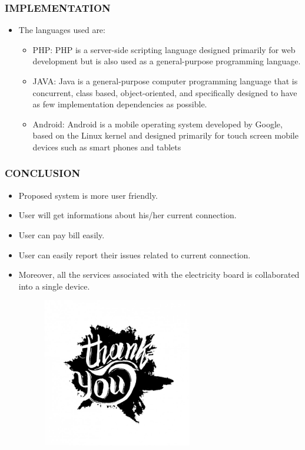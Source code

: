\documentclass{beamer} %
\theoremstyle{definition} %
\begin{document}
\begin{frame}
\frametitle{IMPLEMENTATION}
\begin{itemize}
\item The languages used are:
\begin{itemize}
	\item PHP: PHP is a server-side scripting language designed primarily for web development but is also used as a general-purpose programming language.
	\item JAVA: Java is a general-purpose computer programming language that is concurrent, class based, object-oriented, and speciﬁcally designed to have as few implementation dependencies as possible.
	\item Android: Android is a mobile operating system developed by Google, based on the Linux kernel and designed primarily for touch screen mobile devices such as smart phones and tablets
\end{itemize}
\end{itemize}
\end{frame}
\begin{frame}
\frametitle {CONCLUSION }
\begin{itemize}
	\item Proposed system is more user friendly.
	\item User will get informations about his/her current connection.
	\item User can pay bill easily.
	\item User can easily report their issues related to current connection.
	\item Moreover, all the services associated with the electricity board is collaborated into a single device.
	
	
\end{itemize}
\end{frame}





\begin{frame}
\begin{center}
\begin{figure}[center]
\includegraphics[width=8cm,height=6.5cm]{tu.jpg}
\end{figure}
\end{center}
\end{frame}
\end{document}
